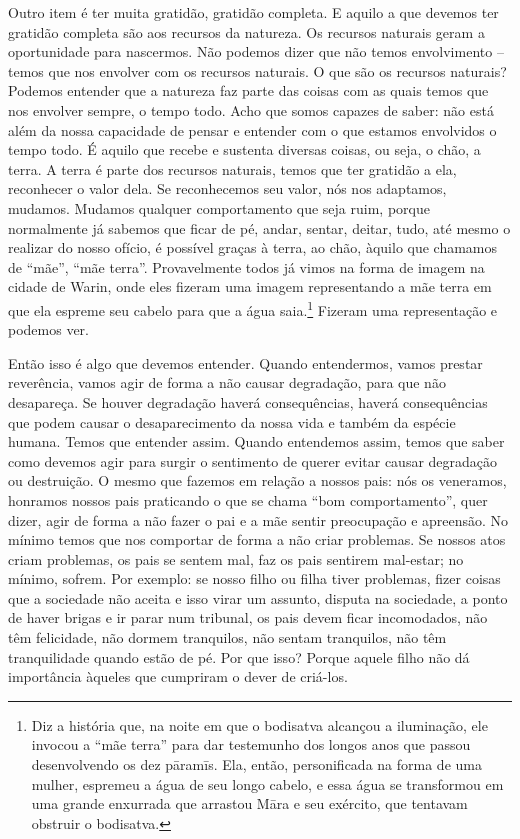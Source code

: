 Outro item é ter muita gratidão, gratidão completa. E aquilo a que
devemos ter gratidão completa são aos recursos da natureza. Os recursos
naturais geram a oportunidade para nascermos. Não podemos dizer que não
temos envolvimento – temos que nos envolver com os recursos naturais. O
que são os recursos naturais? Podemos entender que a natureza faz parte
das coisas com as quais temos que nos envolver sempre, o tempo todo.
Acho que somos capazes de saber: não está além da nossa capacidade de
pensar e entender com o que estamos envolvidos o tempo todo. É aquilo
que recebe e sustenta diversas coisas, ou seja, o chão, a terra. A
terra é parte dos recursos naturais, temos que ter gratidão a ela,
reconhecer o valor dela. Se reconhecemos seu valor, nós nos adaptamos,
mudamos. Mudamos qualquer comportamento que seja ruim, porque
normalmente já sabemos que ficar de pé, andar, sentar, deitar, tudo,
até mesmo o realizar do nosso ofício, é possível graças à terra, ao
chão, àquilo que chamamos de “mãe”, “mãe terra”. Provavelmente todos já
vimos na forma de imagem na cidade de Warin, onde eles fizeram uma
imagem representando a mãe terra em que ela espreme seu cabelo para que
a água saia.\footnote{Diz a história que, na noite em que o bodisatva
alcançou a iluminação, ele invocou a “mãe terra” para dar testemunho
dos longos anos que passou desenvolvendo os dez pāramīs. Ela,
então, personificada na forma de uma mulher, espremeu a água de seu
longo cabelo, e essa água se transformou em uma grande enxurrada que
arrastou Māra e seu exército, que tentavam obstruir o bodisatva.}
Fizeram uma representação e podemos ver. 

Então isso é algo que devemos entender. Quando entendermos, vamos
prestar reverência, vamos agir de forma a não causar degradação, para
que não desapareça. Se houver degradação haverá consequências, haverá
consequências que podem causar o desaparecimento da nossa vida e também
da espécie humana. Temos que entender assim. Quando entendemos assim,
temos que saber como devemos agir para surgir o sentimento de querer
evitar causar degradação ou destruição. O mesmo que fazemos em relação
a nossos pais: nós os veneramos, honramos nossos pais praticando o que
se chama “bom comportamento”, quer dizer, agir de forma a não fazer o
pai e a mãe sentir preocupação e apreensão. No mínimo temos que nos
comportar de forma a não criar problemas. Se nossos atos criam
problemas, os pais se sentem mal, faz os pais sentirem mal-estar; no
mínimo, sofrem. Por exemplo: se nosso filho ou filha tiver problemas,
fizer coisas que a sociedade não aceita e isso virar um assunto,
disputa na sociedade, a ponto de haver brigas e ir parar num tribunal,
os pais devem ficar incomodados, não têm felicidade, não dormem
tranquilos, não sentam tranquilos, não têm tranquilidade quando estão
de pé. Por que isso? Porque aquele filho não dá importância àqueles que
cumpriram o dever de criá-los. 

